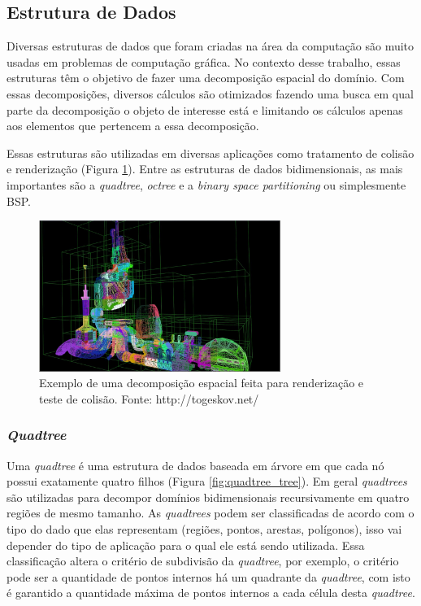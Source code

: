 \subsection{Estrutura de Dados}\label{Estrutura de dados}

Diversas estruturas de dados que foram criadas na área da computação são muito usadas em problemas de computação gráfica. No contexto desse trabalho, essas estruturas têm o objetivo de fazer uma decomposição espacial do domínio. Com essas decomposições, diversos cálculos são otimizados fazendo uma busca em qual parte da decomposição o objeto de interesse está e limitando os cálculos apenas aos elementos que pertencem a essa decomposição.

Essas estruturas são utilizadas em diversas aplicações como tratamento de colisão e renderização (Figura \ref{fig:ex_decomposicao}). Entre as estruturas de dados bidimensionais, as mais importantes são a \textit{quadtree}, \textit{octree} e a \textit{binary space partitioning} ou simplesmente BSP.

 \begin{figure}[htbp]
     \centering
     \includegraphics[width=0.7\textwidth]{fig/ex_decomposicao.jpg}
     \caption{Exemplo de uma decomposição espacial feita para renderização e teste de colisão. Fonte: http://togeskov.net/} 
     \label{fig:ex_decomposicao}
 \end{figure}

\subsubsection{\textit{Quadtree}}

Uma \textit{quadtree} é uma estrutura de dados baseada em árvore em que cada nó possui exatamente quatro filhos (Figura \ref{fig:quadtree_tree}). Em geral \textit{quadtrees} são utilizadas para decompor domínios bidimensionais recursivamente em quatro regiões de mesmo tamanho. As \textit{quadtrees} podem ser classificadas de acordo com o tipo do dado que elas representam (regiões, pontos, arestas, polígonos), isso vai depender do tipo de aplicação para o qual ele está sendo utilizada. Essa classificação altera o critério de subdivisão da \textit{quadtree}, por exemplo, o critério pode ser a quantidade de pontos internos há um quadrante da \textit{quadtree}, com isto é garantido a quantidade máxima de pontos internos a cada célula desta \textit{quadtree}.

